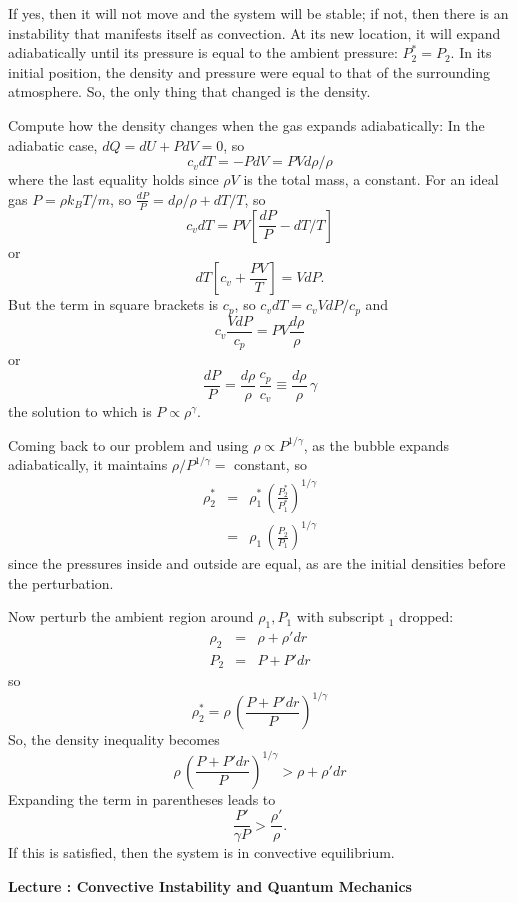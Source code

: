 \documentclass[11pt]{book}
\def\be{\begin{equation}}
\def\ee{\end{equation}}
\def\bea{\begin{eqnarray}}
\def\eea{\end{eqnarray}}
\newcommand{\vs}{\nonumber\\}
\newcommand\lecture[1]{\newpage
\addtocounter{lectureno}{1}
\setcounter{secno}{0}
\begin{center}
 {\bf Lecture \arabic{lectureno}: #1}
\end{center}
}
\newcounter{lectureno}
\newcounter{secno}
\begin{document}
If yes, then it will not move and the system will be stable; if not, then there is an instability that manifests itself as convection. At its new location, it will expand adiabatically until its pressure is equal to the ambient pressure: $P_2^*=P_2$. In its initial position, the density and pressure were equal to that of the surrounding atmosphere. So, the only thing that changed is the density. 


Compute how the density changes when the gas expands adiabatically:
In the adiabatic case, $dQ=dU+PdV=0$, so 
\be
c_vdT= - PdV=PVd\rho/\rho
\ee
where the last equality holds since $\rho V$ is the total mass, a constant. For an ideal gas $P=\rho k_B T/m$, so $\frac{dP}P=d\rho/\rho +dT/T$, so 
\be
c_v dT  = PV [\frac{dP}P - dT/T] \ee
or
\be
dT \left[ c_v + \frac{PV}{T} \right] = V dP
.\ee
But the term in square brackets is $c_p$, so $c_vdT= c_vVdP/c_p$ and
\be
c_v \frac{VdP}{c_p} = PV \frac{d\rho}{\rho}\ee
or
\be
\frac{dP}P = \frac{d\rho}\rho \,\frac{c_p}{c_v} \equiv \frac{d\rho}\rho \,\gamma\ee
%
the solution to which is $P\propto \rho^\gamma$.



Coming back to our problem and using $\rho\propto P^{1/\gamma}$, as the bubble expands adiabatically, it maintains $\rho/P^{1/\gamma}=$ constant, so
\bea
\rho_2^* &=& \rho_1^*\,\left(\frac{P_2^*}{P_1^*}\right)^{1/\gamma}
\vs
&=&
 \rho_1\,\left(\frac{P_2}{P_1}\right)^{1/\gamma}\eea
 since the pressures inside and outside are equal, as are the initial densities before the perturbation.


Now perturb the ambient region around $\rho_1,P_1$ with subscript $_1$ dropped:
\bea\rho_2&=&\rho+\rho' dr\vs
P_2&=&P+P'dr
\eea
so
\be
\rho_2^*= \rho \,\left(\frac{P+P'dr}{P}\right)^{1/\gamma}\ee
So, the density inequality becomes
\be
\rho \,\left(\frac{P+P'dr}{P}\right)^{1/\gamma}> \rho + \rho' dr\ee
Expanding the term in parentheses leads to
\be
\frac{P'}{\gamma P} > \frac{\rho'}{\rho}.
\ee
If this is satisfied, then the system is in convective equilibrium.

\lecture{Convective Instability and Quantum Mechanics}
\end{document}
